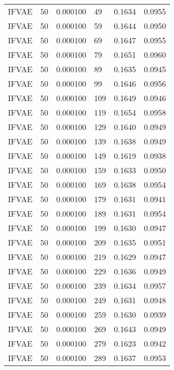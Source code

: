 \begin{tabular}{llrlrr}
   IFVAE &   50 &  0.000100 &    49 &  0.1634 &       0.0955 \\
   IFVAE &   50 &  0.000100 &    59 &  0.1644 &       0.0950 \\
   IFVAE &   50 &  0.000100 &    69 &  0.1647 &       0.0955 \\
   IFVAE &   50 &  0.000100 &    79 &  0.1651 &       0.0960 \\
   IFVAE &   50 &  0.000100 &    89 &  0.1635 &       0.0945 \\
   IFVAE &   50 &  0.000100 &    99 &  0.1646 &       0.0956 \\
   IFVAE &   50 &  0.000100 &   109 &  0.1649 &       0.0946 \\
   IFVAE &   50 &  0.000100 &   119 &  0.1654 &       0.0958 \\
   IFVAE &   50 &  0.000100 &   129 &  0.1640 &       0.0949 \\
   IFVAE &   50 &  0.000100 &   139 &  0.1638 &       0.0949 \\
   IFVAE &   50 &  0.000100 &   149 &  0.1619 &       0.0938 \\
   IFVAE &   50 &  0.000100 &   159 &  0.1633 &       0.0950 \\
   IFVAE &   50 &  0.000100 &   169 &  0.1638 &       0.0954 \\
   IFVAE &   50 &  0.000100 &   179 &  0.1631 &       0.0941 \\
   IFVAE &   50 &  0.000100 &   189 &  0.1631 &       0.0954 \\
   IFVAE &   50 &  0.000100 &   199 &  0.1630 &       0.0947 \\
   IFVAE &   50 &  0.000100 &   209 &  0.1635 &       0.0951 \\
   IFVAE &   50 &  0.000100 &   219 &  0.1629 &       0.0947 \\
   IFVAE &   50 &  0.000100 &   229 &  0.1636 &       0.0949 \\
   IFVAE &   50 &  0.000100 &   239 &  0.1634 &       0.0957 \\
   IFVAE &   50 &  0.000100 &   249 &  0.1631 &       0.0948 \\
   IFVAE &   50 &  0.000100 &   259 &  0.1630 &       0.0939 \\
   IFVAE &   50 &  0.000100 &   269 &  0.1643 &       0.0949 \\
   IFVAE &   50 &  0.000100 &   279 &  0.1623 &       0.0942 \\
   IFVAE &   50 &  0.000100 &   289 &  0.1637 &       0.0953 \\

\end{tabular}
